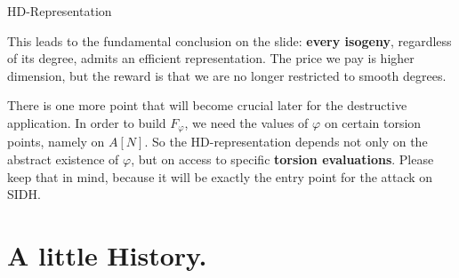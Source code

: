 \documentclass[aspectratio=169,notheorems]{beamer}
\begin{document}
\begin{frame}{HD-Representation}
{			This leads to the fundamental conclusion on the slide: \textbf{every isogeny}, regardless of its degree, admits an efficient representation. The price we pay is higher dimension, but the reward is that we are no longer restricted to smooth degrees.
			
			There is one more point that will become crucial later for the destructive application. In order to build \(F_\varphi\), we need the values of \(\varphi\) on certain torsion points, namely on \(A[N]\). So the HD-representation depends not only on the abstract existence of \(\varphi\), but on access to specific \textbf{torsion evaluations}. Please keep that in mind, because it will be exactly the entry point for the attack on SIDH.
		}
	\end{frame}
	
	
	
	\section{A little History.}
	
\end{document}
